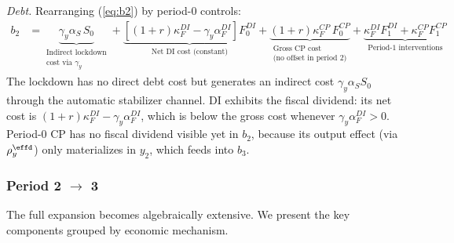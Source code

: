 \documentclass[12pt, a4paper]{article}
\begin{document}
\textit{Debt.} Rearranging (\ref{eq:b2}) by period-0 controls:
%
\begin{align}
    b_2 &= \underbrace{\gamma_y \alpha_S \, S_0}_{\substack{\text{Indirect lockdown} \\ \text{cost via } \gamma_y}}
    + \underbrace{\left[(1+r)\kappa_F^{DI} - \gamma_y \alpha_F^{DI}\right] F_0^{DI}}_{\text{Net DI cost (constant)}}
    + \underbrace{(1+r)\kappa_F^{CP} \, F_0^{CP}}_{\substack{\text{Gross CP cost} \\ \text{(no offset in period 2)}}}
    + \underbrace{\kappa_F^{DI} F_1^{DI} + \kappa_F^{CP} F_1^{CP}}_{\text{Period-1 interventions}}
    \label{eq:b2_grouped}
\end{align}
%
The lockdown has no direct debt cost but generates an indirect cost $\gamma_y \alpha_S S_0$ through the automatic stabilizer channel. DI exhibits the fiscal dividend: its net cost is $(1+r)\kappa_F^{DI} - \gamma_y \alpha_F^{DI}$, which is below the gross cost whenever $\gamma_y \alpha_F^{DI} > 0$. Period-0 CP has no fiscal dividend visible yet in $b_2$, because its output effect (via $\rho_y^{\effd}$) only materializes in $y_2$, which feeds into $b_3$.

\subsubsection*{Period 2 $\to$ 3}

The full expansion becomes algebraically extensive. We present the key components grouped by economic mechanism.
\end{document}
